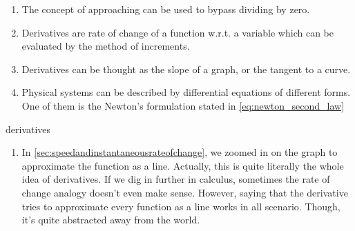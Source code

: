\conclusion

\begin{enumerate}[noitemsep]
    \item The concept of approaching can be used to bypass dividing by zero.
    \item Derivatives are rate of change of a function w.r.t. a variable which can be evaluated by the method of increments.
    \item Derivatives can be thought as the slope of a graph, or the tangent to a curve.
    \item Physical systems can be described by differential equations of different forms. One of them is the Newton's formulation stated in \cref{eq:newton_second_law}
\end{enumerate}

\begin{remark}{}{derivatives}
    \begin{enumerate}
        \item In \cref{sec:speedandinstantaneousrateofchange}, we zoomed in on the graph to approximate the function as a line. Actually, this is quite literally the whole idea of derivatives. If we dig in further in calculus, sometimes the rate of change analogy doesn't even make sense. However, saying that the derivative tries to approximate every function as a line works in all scenario. Though, it's quite abstracted away from the world.
    \end{enumerate}
\end{remark}